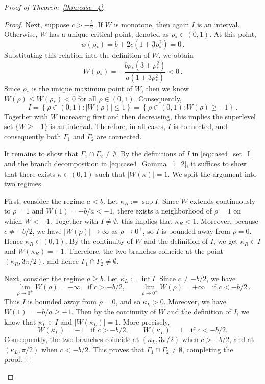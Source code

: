 \documentclass[10pt]{article}
\theoremstyle{definition}
\theoremstyle{definition}
\numberwithin{equation}{section}
\begin{document}
\begin{proof}[Proof of Theorem~\ref{thm:case_4}]
\begin{proof}
Next, suppose $c > -\frac{b}{2}$.
If $W$ is monotone, then again $I$ is an interval.
Otherwise, $W$ has a unique critical point, denoted as $\rho_* \in (0,1)$.
At this point,
\[
w(\rho_*) = b + 2c \left(1 + 3 \rho_*^2 \right) = 0 \, .
\]
Substituting this relation into the definition of $W$, we obtain
\begin{equation*}
W (\rho_*) = - \frac{b \rho_* (3 + \rho_*^2)}{a (1 + 3\rho_*^2)} < 0 \, .
\end{equation*}
Since $\rho_*$ is the unique maximum point of $W$, then we know $W(\rho) \leq W(\rho_*) < 0$ for all $\rho \in (0,1)$.
Consequently, 
\begin{equation*}
I = \left\{ \rho \in (0,1): |W(\rho)| \leq 1 \right\} = \left\{ \rho \in (0,1): W(\rho) \geq - 1 \right\} \, .
\end{equation*}
Together with $W$ increasing first and then decreasing, this implies the superlevel set $\{W \geq -1\}$ is an interval.
Therefore, in all cases, $I$ is connected, and consequently both $\Gamma_1$ and $\Gamma_2$ are connected.

It remains to show that $\Gamma_1 \cap \Gamma_2 \neq \emptyset$.
By the definitions of $I$ in \eqref{eq:case4_set_I} and the branch decomposition in \eqref{eq:case4_Gamma_1_2}, it suffices to show that there exists $\kappa \in (0,1)$ such that $|W(\kappa)| = 1$.
We split the argument into two regimes.

First, consider the regime $a < b$.
Let $\kappa_R := \sup I$.
Since $W$ extends continuously to $\rho=1$ and $W(1) = -b/a < - 1$, there exists a neighborhood of $\rho=1$ on which $W < -1$.
Together with $I \neq \emptyset$, this implies that $\kappa_R < 1$.
Moreover, because $c \neq -b/2$, we have $|W(\rho)| \to \infty$ as $\rho \to 0^+$, so $I$ is bounded away from $\rho=0$.
Hence $\kappa_R \in (0,1)$.
By the continuity of $W$ and the definition of $I$, we get $\kappa_R \in I$ and $W(\kappa_R) = -1$.
Therefore, the two branches coincide at the point $(\kappa_R, 3\pi/2)$, and hence $\Gamma_1 \cap \Gamma_2 \neq \emptyset$.

Next, consider the regime $a \geq b$.
Let $\kappa_L := \inf I$.
Since $c \neq -b/2$, we have
\[
\lim_{\rho\to0^+} W(\rho)=-\infty
\quad\text{if } c>-b/2,
\qquad
\lim_{\rho\to0^+} W(\rho)=+\infty
\quad\text{if } c<-b/2 \, .
\]
Thus $I$ is bounded away from $\rho=0$, and so $\kappa_L > 0$.
Moreover, we have $W(1) = -b/a \geq -1$.
Then by the continuity of $W$ and the definition of $I$, we know that $\kappa_L \in I$ and $|W(\kappa_L)| = 1$.
More precisely,
\[
W(\kappa_L)=-1
\quad\text{if } c>-b/2,
\qquad
W(\kappa_L)=1
\quad\text{if } c<-b/2.
\]
Consequently, the two branches coincide at $(\kappa_L,3\pi/2)$ when $c > -b/2$, and at $(\kappa_L,\pi/2)$ when $c < -b/2$. 
This proves that $\Gamma_1 \cap \Gamma_2 \neq \emptyset$, completing the proof.
\end{proof}


\end{proof}
\end{document}
